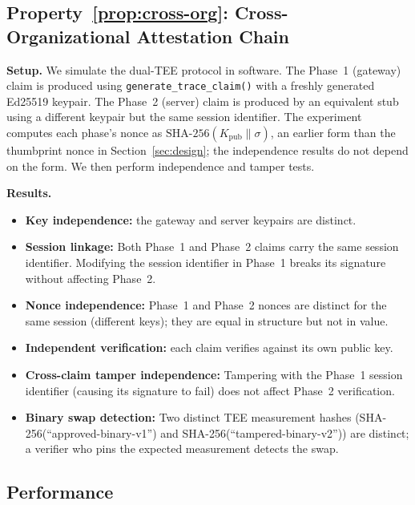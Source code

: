 \subsection{Property~\ref{prop:cross-org}: Cross-Organizational Attestation Chain}

\textbf{Setup.} We simulate the dual-TEE protocol in software. The Phase~1 (gateway) claim
is produced using \texttt{generate\_trace\_claim()} with a freshly generated Ed25519
keypair. The Phase~2 (server) claim is produced by an equivalent stub using a different
keypair but the same session identifier. The experiment computes each phase's nonce as
$\text{SHA-256}(K_{\text{pub}} \| \sigma)$, an earlier form than the thumbprint nonce in
Section~\ref{sec:design}; the independence results do not depend on the form. We then
perform independence and tamper tests.

\textbf{Results.}
\begin{itemize}[leftmargin=1.5em]
  \item \textbf{Key independence:} the gateway and server keypairs are distinct.
  \item \textbf{Session linkage:} Both Phase~1 and Phase~2 claims carry the same session
    identifier. Modifying the session identifier in Phase~1 breaks its signature without
    affecting Phase~2.
  \item \textbf{Nonce independence:} Phase~1 and Phase~2 nonces are distinct for the same
    session (different keys); they are equal in structure but not in value.
  \item \textbf{Independent verification:} each claim verifies against its own public
    key.
  \item \textbf{Cross-claim tamper independence:} Tampering with the Phase~1 session
    identifier (causing its signature to fail) does not affect Phase~2 verification.
  \item \textbf{Binary swap detection:} Two distinct TEE measurement hashes
    (SHA-256(``approved-binary-v1'') and SHA-256(``tampered-binary-v2'')) are distinct;
    a verifier who pins the expected measurement detects the swap.
\end{itemize}

\subsection{Performance}
\label{sec:perf}

